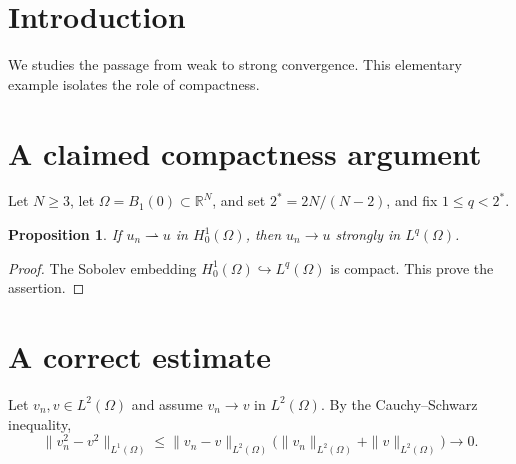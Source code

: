 \documentclass{article}
\newcommand{\HH}{H_0^1(\Omega)}
\newtheorem{proposition}{Proposition}
\begin{document}
\section{Introduction}
\label{sec:introduction}
We studies the passage from weak to strong convergence.
This elementary example isolates the role of compactness.

\section{A claimed compactness argument}
Let $N\geq 3$, let $\Omega=B_1(0)\subset\mathbb R^N$, and set
$2^*=2N/(N-2)$, and fix $1\leq q<2^*$.
\begin{proposition}\label{prop:critical}
If $u_n\rightharpoonup u$ in $\HH$, then
$u_n\to u$ strongly in $L^q(\Omega)$.
\end{proposition}
\begin{proof}
The Sobolev embedding $\HH\hookrightarrow L^q(\Omega)$ is compact.
This prove the assertion.
\end{proof}

\section{A correct estimate}
Let $v_n,v\in L^2(\Omega)$ and assume $v_n\to v$ in $L^2(\Omega)$.
By the Cauchy--Schwarz inequality,
\[
 \|v_n^2-v^2\|_{L^1(\Omega)}
 \leq \|v_n-v\|_{L^2(\Omega)}
       \bigl(\|v_n\|_{L^2(\Omega)}+\|v\|_{L^2(\Omega)}\bigr)\to0.
\]
\end{document}

